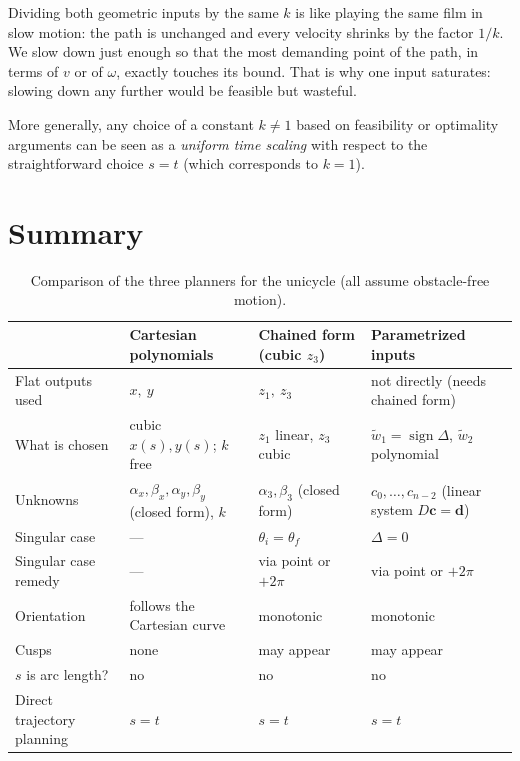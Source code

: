 \documentclass[11pt,a4paper]{article}
\newcommand{\wwt}{\tilde w}
\newcommand{\sign}{\operatorname{sign}}
\theoremstyle{definition}
\theoremstyle{plain}
\theoremstyle{remark}
\begin{document}
\begin{intuition}
Dividing both geometric inputs by the same $k$ is like playing the same film in slow motion: the path is unchanged and every
velocity shrinks by the factor $1/k$. We slow down just enough so that the most demanding point of the path, in terms of
$v$ or of $\omega$, exactly touches its bound. That is why one input saturates: slowing down any further would be feasible but wasteful.
\end{intuition}
 
More generally, any choice of a constant $k\ne1$ based on feasibility or optimality arguments can be seen as a \emph{uniform time
scaling} with respect to the straightforward choice $s=t$ (which corresponds to $k=1$).
\section{Summary}

\begin{table}[h]
\centering
\small
\renewcommand{\arraystretch}{1.25}
\begin{tabular}{@{}p{3.2cm}p{3.7cm}p{3.7cm}p{3.7cm}@{}}
\toprule
 & \textbf{Cartesian polynomials} & \textbf{Chained form (cubic $z_3$)} & \textbf{Parametrized inputs}\\
\midrule
Flat outputs used & $x,\ y$ & $z_1,\ z_3$ & not directly (needs chained form)\\
What is chosen & cubic $x(s),y(s)$; $k$ free & $z_1$ linear, $z_3$ cubic & $\wwt_1=\sign\Delta$, $\wwt_2$ polynomial\\
Unknowns & $\alpha_x,\beta_x,\alpha_y,\beta_y$ (closed form), $k$ & $\alpha_3,\beta_3$ (closed form) & $c_0,\dots,c_{n-2}$ (linear system $D\boldsymbol c=\boldsymbol d$)\\
Singular case & --- & $\theta_i=\theta_f$ & $\Delta=0$\\
Singular case remedy & --- & via point or $+2\pi$ & via point or $+2\pi$\\
Orientation & follows the Cartesian curve & monotonic & monotonic\\
Cusps & none & may appear & may appear\\
$s$ is arc length? & no & no & no\\
Direct trajectory planning & $s=t$ & $s=t$ & $s=t$\\
\bottomrule
\end{tabular}
\caption{Comparison of the three planners for the unicycle (all assume obstacle-free motion).}
\end{table}
\end{document}
